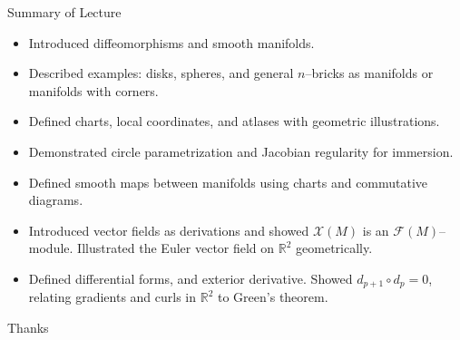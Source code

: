 \begin{frame}{Summary of Lecture}
\vspace{-0.3cm}
\begin{itemize}
\item Introduced diffeomorphisms and smooth manifolds.
\item Described examples: disks, spheres, and general $n$–bricks as manifolds or manifolds with corners.
\item Defined charts, local coordinates, and atlases with geometric illustrations.
\item Demonstrated circle parametrization and Jacobian regularity for immersion.
\item Defined smooth maps between manifolds using charts and commutative diagrams.
\item Introduced vector fields as derivations and showed $\mathcal{X}(M)$ is an $\mathcal{F}(M)$–module. Illustrated the Euler vector field on $\mathbb{R}^2$ geometrically.
\item Defined differential forms, and exterior derivative. Showed $d_{p+1}\circ d_p=0$, relating gradients and curls in $\mathbb{R}^2$ to Green’s theorem.
\end{itemize}
\end{frame}

\begin{frame}{Thanks}
  \cmcendframe
\end{frame}


